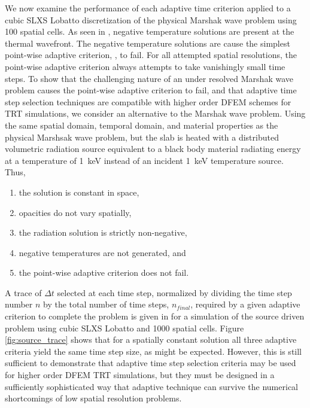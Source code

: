 We now examine the performance of each adaptive time criterion applied to a cubic SLXS Lobatto discretization of the physical Marshak wave problem using 100 spatial cells.
As seen in , negative temperature solutions are present at the thermal wavefront.
The negative temperature solutions are cause the simplest point-wise adaptive criterion, , to fail.
For all attempted spatial resolutions, the point-wise adaptive criterion always attempts to take vanishingly small time steps.
To show that the challenging nature of an under resolved Marshak wave problem causes the point-wise adaptive criterion to fail, and that adaptive time step selection techniques 
are  compatible with higher order DFEM schemes for TRT simulations, we consider an alternative to the Marshak wave problem.
Using the same spatial domain, temporal domain, and material properties as the physical Marshsak wave problem, but the slab is heated with  a distributed volumetric radiation source equivalent to a black body material radiating energy at a temperature of 1~keV instead of an incident 1~keV temperature source.
Thus, 
\begin{enumerate}
\item the solution is constant in space, 
\item opacities do not vary spatially,
\item the radiation solution is strictly non-negative, 
\item negative temperatures are not generated, and
\item the point-wise adaptive criterion does not fail.
\end{enumerate}
A trace of $\Delta t$ selected at each time step, normalized by dividing the time step number $n$ by the total number of time steps, $n_{final}$, required by a given adaptive criterion to complete the problem is given in  for a simulation of the source driven problem using cubic SLXS Lobatto and 1000 spatial cells.
Figure \ref{fig:source_trace} shows that for a spatially constant solution all three adaptive criteria yield the same time step size, as might be expected.  However, this is still sufficient to demonstrate that adaptive time step selection criteria may be used for higher order DFEM TRT simulations, but they must be designed in a sufficiently sophisticated way that adaptive technique can survive the numerical shortcomings of low spatial resolution problems.
